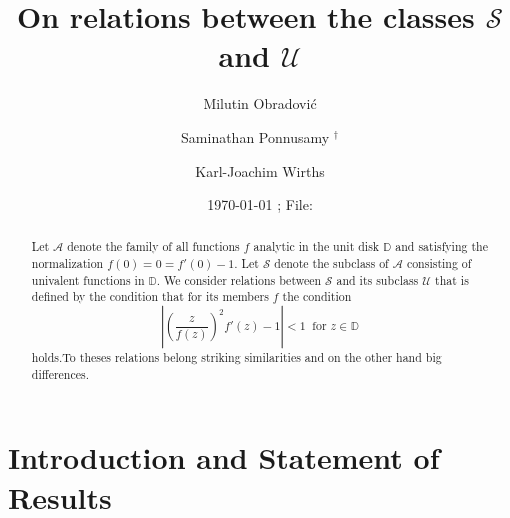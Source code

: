 \documentclass[a4paper,12pt]{amsart}
\theoremstyle{definition}
\begin{document}

\title[On relations between the classes $\mathcal S$ and  $\mathcal U$
]{On relations between the classes $\mathcal S$ and  $\mathcal U$}

\author[M. Obradovi\'{c}]{Milutin Obradovi\'{c}}
\address{M. Obradovi\'{c},
Department of Mathematics,
Faculty of Civil Engineering, University of Belgrade,
Bulevar Kralja Aleksandra 73, 11000
Belgrade, Serbia. }

\author[S. Ponnusamy]{Saminathan Ponnusamy
$^\dagger $
}
\address{S. Ponnusamy, Indian Statistical Institute (ISI), Chennai Centre, SETS (Society
for Electronic Transactions and Security), MGR Knowledge City, CIT
Campus, Taramani, Chennai 600 113, India.}

\author[K.-J. Wirths]{Karl-Joachim Wirths}
\address{K.-J. Wirths, Institut f\"ur Analysis und Algebra,
TU Braunschweig, Pockelsstr. 14 D 38106 Braunschweig, Germany.}

\date{\today  
;  File: }

\begin{abstract}
Let ${\mathcal A}$ denote the family of all functions $f$ analytic
in the unit disk ${{\mathbb D}}$ and satisfying the normalization
$f(0)=0= f'(0)-1$. Let $\mathcal{S}$ denote the subclass of ${\mathcal A}$ consisting of univalent functions  in  ${{\mathbb D}}$. We consider relations between $\mathcal{S}$ and its subclass $\mathcal{U} $ that is defined by the condition that for its members $f$ the condition
$$\left |\left (\frac{z}{f(z)} \right )^{2}f'(z)-1\right | < 1
 ~\mbox{ for $z\in {{\mathbb D}}$}$$
holds.To theses relations belong striking similarities and on the other hand big differences.
\end{abstract}

\maketitle
\pagestyle{myheadings}
{\setcounter{equation}{0}   
\setcounter{figure}{0}\setcounter{table}{0}}

\section{Introduction and Statement of Results}
\end{document}
